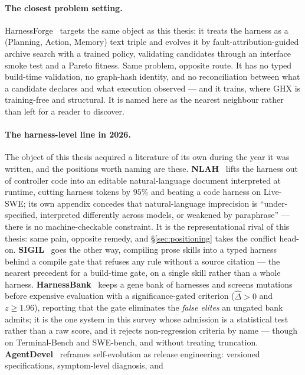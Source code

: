 \paragraph{The closest problem setting.} HarnessForge~\cite{harnessforge}
targets the same object as this thesis: it treats the harness as a
(Planning, Action, Memory) text triple and evolves it by
fault-attribution-guided archive search with a trained policy, validating
candidates through an interface smoke test and a Pareto fitness. Same
problem, opposite route. It has no typed build-time validation, no
graph-hash identity, and no reconciliation between what a candidate
declares and what execution observed --- and it trains, where GHX is
training-free and structural. It is named here as the nearest neighbour
rather than left for a reader to discover.

\paragraph{The harness-level line in 2026.} The object of this thesis
acquired a literature of its own during the year it was written, and the
positions worth naming are these. \textbf{NLAH}~\cite{nlah} lifts the
harness out of controller code into an editable natural-language document
interpreted at runtime, cutting harness tokens by $95\%$ and beating a
code harness on Live-SWE; its own appendix concedes that natural-language
imprecision is ``under-specified, interpreted differently across models,
or weakened by paraphrase'' --- there is no machine-checkable constraint.
It is the representational rival of this thesis: same pain, opposite
remedy, and \S\ref{sec:positioning} takes the conflict head-on.
\textbf{SIGIL}~\cite{sigil} goes the other way, compiling prose skills
into a typed harness behind a compile gate that refuses any rule without
a source citation --- the nearest precedent for a build-time gate, on a
single skill rather than a whole harness. \textbf{HarnessBank}~\cite{harnessbank}
keeps a gene bank of harnesses and screens mutations before expensive
evaluation with a significance-gated criterion
($\hat{\Delta} > 0$ and $z \ge 1.96$), reporting that the gate eliminates
the \emph{false elites} an ungated bank admits; it is the one system in
this survey whose admission is a statistical test rather than a raw
score, and it rejects non-regression criteria by name --- though on
Terminal-Bench and SWE-bench, and without treating truncation.
\textbf{AgentDevel}~\cite{agentdevel} reframes self-evolution as release
engineering: versioned specifications, symptom-level diagnosis, and
